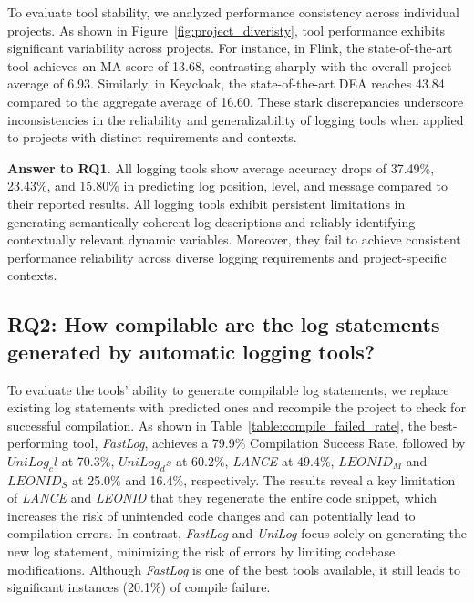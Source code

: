 To evaluate tool stability, we analyzed performance consistency across individual projects. As shown in Figure~\ref{fig:project_diveristy}, tool performance exhibits significant variability across projects. For instance, in Flink, the state-of-the-art tool achieves an MA score of 13.68, contrasting sharply with the overall project average of 6.93. Similarly, in Keycloak, the state-of-the-art DEA reaches 43.84 compared to the aggregate average of 16.60. These stark discrepancies underscore inconsistencies in the reliability and generalizability of logging tools when applied to projects with distinct requirements and contexts.


\begin{tcolorbox}
    \textbf{Answer to RQ1.} 
    All logging tools show average accuracy drops of 37.49\%, 23.43\%, and 15.80\% in
predicting log position, level, and message compared to their reported results.
    All logging tools exhibit persistent limitations in generating semantically coherent log descriptions and reliably identifying contextually relevant dynamic variables. Moreover, they fail to achieve consistent performance reliability across diverse logging requirements and project-specific contexts.
\end{tcolorbox}



\subsection{RQ2: How compilable are the log statements generated by automatic logging tools?}
\label{rq2}
To evaluate the tools’ ability to generate compilable log statements, we replace existing log statements with predicted ones and recompile the project to check for successful compilation. As shown in Table~\ref{table:compile_failed_rate},
the best-performing tool, \textit{FastLog}, achieves a 79.9\% Compilation Success Rate, followed by \(UniLog_cl\) at 70.3\%, \(UniLog_ds\) at 60.2\%, \textit{LANCE} at 49.4\%, \(LEONID_M\) and \(LEONID_S\) at 25.0\% and 16.4\%, respectively.
The results reveal a key limitation of \textit{LANCE} and \textit{LEONID} that they regenerate the entire code snippet, which increases the risk of unintended code changes and can potentially lead to compilation errors. In contrast, \textit{FastLog} and \textit{UniLog} focus solely on generating the new log statement, minimizing the risk of errors by limiting codebase modifications. Although \textit{FastLog} is one of the best tools available, it still leads to significant instances (20.1\%) of compile failure. 

